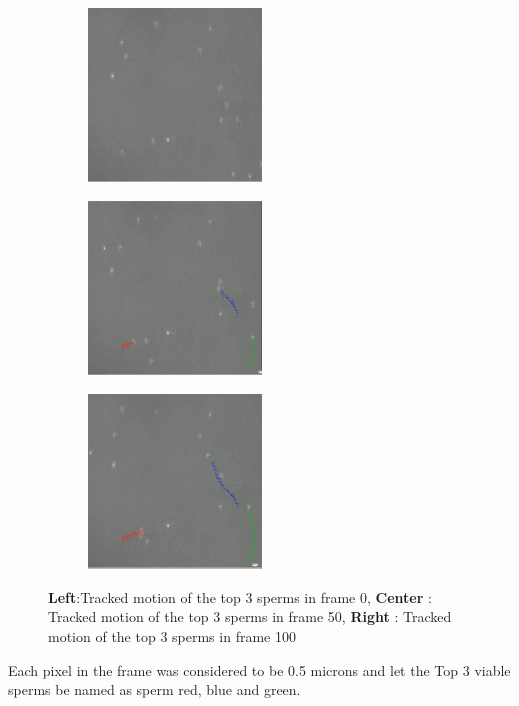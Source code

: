 \documentclass{article}
\begin{document}
\begin{figure}[H]
  \centering
  \begin{subfigure}{4.6cm}
    \centering\includegraphics[width=4.6cm]{frame_0.png}
  \end{subfigure}
  \begin{subfigure}{4.6cm}
    \centering\includegraphics[width=4.6cm]{frame_50.png}
  \end{subfigure}
  \begin{subfigure}{4.6cm}
    \centering\includegraphics[width=4.6cm]{frame_100.png}
  \end{subfigure}
  \caption{ 
  \textbf{Left}:Tracked motion of the top 3 sperms in frame 0,
  \textbf{Center} : Tracked motion of the top 3 sperms in frame 50,
  \textbf{Right} : Tracked motion of the top 3 sperms in frame 100}
  \label{fig:pred_video_motion}
\end{figure}
Each pixel in the frame was considered to be 0.5 microns and let the Top 3 viable sperms be named as sperm red, blue and green. \\
\end{document}
